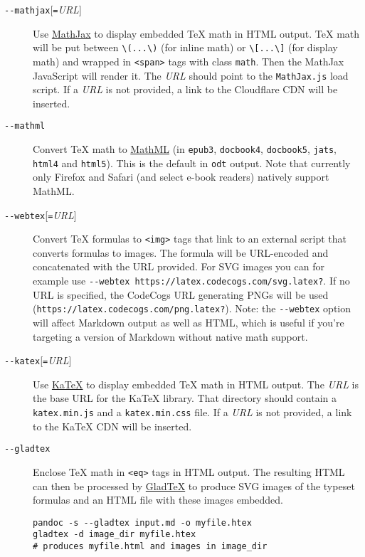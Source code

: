 \documentclass[
]{article}
\begin{document}
\begin{description}
\item[\texttt{-\/-mathjax}{[}\texttt{=}\emph{URL}{]}]
Use \href{https://www.mathjax.org}{MathJax} to display embedded TeX math
in HTML output. TeX math will be put between
\texttt{\textbackslash{}(...\textbackslash{})} (for inline math) or
\texttt{\textbackslash{}{[}...\textbackslash{}{]}} (for display math)
and wrapped in \texttt{\textless{}span\textgreater{}} tags with class
\texttt{math}. Then the MathJax JavaScript will render it. The
\emph{URL} should point to the \texttt{MathJax.js} load script. If a
\emph{URL} is not provided, a link to the Cloudflare CDN will be
inserted.
\item[\texttt{-\/-mathml}]
Convert TeX math to \href{https://www.w3.org/Math/}{MathML} (in
\texttt{epub3}, \texttt{docbook4}, \texttt{docbook5}, \texttt{jats},
\texttt{html4} and \texttt{html5}). This is the default in \texttt{odt}
output. Note that currently only Firefox and Safari (and select e-book
readers) natively support MathML.
\item[\texttt{-\/-webtex}{[}\texttt{=}\emph{URL}{]}]
Convert TeX formulas to \texttt{\textless{}img\textgreater{}} tags that
link to an external script that converts formulas to images. The formula
will be URL-encoded and concatenated with the URL provided. For SVG
images you can for example use
\texttt{-\/-webtex\ https://latex.codecogs.com/svg.latex?}. If no URL is
specified, the CodeCogs URL generating PNGs will be used
(\texttt{https://latex.codecogs.com/png.latex?}). Note: the
\texttt{-\/-webtex} option will affect Markdown output as well as HTML,
which is useful if you're targeting a version of Markdown without native
math support.
\item[\texttt{-\/-katex}{[}\texttt{=}\emph{URL}{]}]
Use \href{https://github.com/Khan/KaTeX}{KaTeX} to display embedded TeX
math in HTML output. The \emph{URL} is the base URL for the KaTeX
library. That directory should contain a \texttt{katex.min.js} and a
\texttt{katex.min.css} file. If a \emph{URL} is not provided, a link to
the KaTeX CDN will be inserted.
\item[\texttt{-\/-gladtex}]
Enclose TeX math in \texttt{\textless{}eq\textgreater{}} tags in HTML
output. The resulting HTML can then be processed by
\href{https://humenda.github.io/GladTeX/}{GladTeX} to produce SVG images
of the typeset formulas and an HTML file with these images embedded.

\begin{verbatim}
pandoc -s --gladtex input.md -o myfile.htex
gladtex -d image_dir myfile.htex
# produces myfile.html and images in image_dir
\end{verbatim}
\end{description}
\end{document}
